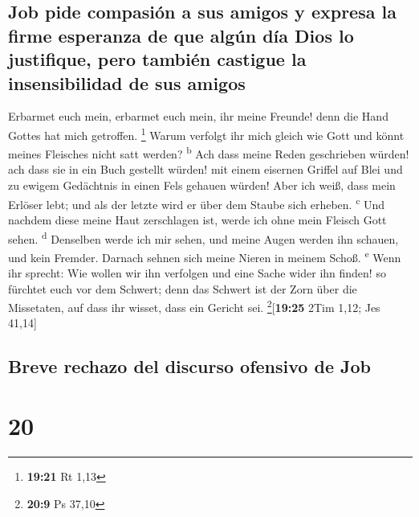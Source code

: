 \hypertarget{job-pide-compasiuxf3n-a-sus-amigos-y-expresa-la-firme-esperanza-de-que-alguxfan-duxeda-dios-lo-justifique-pero-tambiuxe9n-castigue-la-insensibilidad-de-sus-amigos}{%
\subsection{Job pide compasión a sus amigos y expresa la firme esperanza
de que algún día Dios lo justifique, pero también castigue la
insensibilidad de sus
amigos}\label{job-pide-compasiuxf3n-a-sus-amigos-y-expresa-la-firme-esperanza-de-que-alguxfan-duxeda-dios-lo-justifique-pero-tambiuxe9n-castigue-la-insensibilidad-de-sus-amigos}}

 Erbarmet euch mein, erbarmet euch mein, ihr meine
Freunde! denn die Hand Gottes hat mich getroffen. \footnote{\textbf{19:21}
  Rt 1,13}  Warum verfolgt ihr mich gleich wie Gott und
könnt meines Fleisches nicht satt werden? \textsuperscript{b}
 Ach dass meine Reden geschrieben würden! ach dass sie in
ein Buch gestellt würden!  mit einem eisernen Griffel auf
Blei und zu ewigem Gedächtnis in einen Fels gehauen würden!
 Aber ich weiß, dass mein Erlöser lebt; und als der
letzte wird er über dem Staube sich erheben. \textsuperscript{c}
 Und nachdem diese meine Haut zerschlagen ist, werde ich
ohne mein Fleisch Gott sehen. \textsuperscript{d} 
Denselben werde ich mir sehen, und meine Augen werden ihn schauen, und
kein Fremder. Darnach sehnen sich meine Nieren in meinem Schoß.
\textsuperscript{e}  Wenn ihr sprecht: Wie wollen wir ihn
verfolgen und eine Sache wider ihn finden!  so fürchtet
euch vor dem Schwert; denn das Schwert ist der Zorn über die Missetaten,
auf dass ihr wisset, dass ein Gericht sei. \footnote{\textbf{20:9} Ps
  37,10}{[}\textbf{19:25} 2Tim 1,12; Jes 41,14{]}

\hypertarget{breve-rechazo-del-discurso-ofensivo-de-job}{%
\subsection{Breve rechazo del discurso ofensivo de
Job}\label{breve-rechazo-del-discurso-ofensivo-de-job}}

\hypertarget{section-19}{%
\section{20}\label{section-19}}


